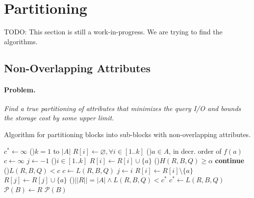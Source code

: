 \documentclass[twocolumn]{svjour3}          %
\let\emptyset\varnothing
\begin{document}
\section{Partitioning}

TODO: This section is still a work-in-progress. We are trying to find the algorithms.


\subsection{Non-Overlapping Attributes}

\paragraph*{Problem.}\emph{Find a true partitioning of attributes that minimizes
  the query I/O and bounds the storage cost by some upper limit.}


\begin{algorithm}[h]
\scriptsize
\caption{Algorithm for partitioning blocks into sub-blocks with non-overlapping attributes.}
\label{alg:overlappingP}
$c^*\leftarrow \infty$ 
\For(){$k=1$ to $|A|$}{
   $R[i]\leftarrow \emptyset, \forall i\in [1..k]$ 
   \For(){$a \in A$\textnormal{, in decr.\/ order of }$f(a)$}{
      $c\leftarrow \infty$   
      $j\leftarrow -1$ 
      \For(){$i\in [1..k]$} {
         $R[i]\leftarrow R[i] \cup \{a\}$
         \If(){$H(R, B, Q)\geq\alpha$}{
            \textbf{continue}
         }
         \If(){$L(R, B, Q)<c$}{
            $c\leftarrow L(R, B, Q)$
            $j\leftarrow i$
         }
         $R[i]\leftarrow R[i] \setminus \{a\}$
      }
      $R[j]\leftarrow R[j] \cup \{a\}$
   }
   \If(){$||R||=|A| \wedge L(R, B, Q)<c^*$}{
      $c^* \leftarrow L(R, B, Q)$
      $\mathcal{P}(B)\leftarrow R$
   }
}
\Return $\mathcal{P}(B)$ 
\end{algorithm} 
\end{document}
